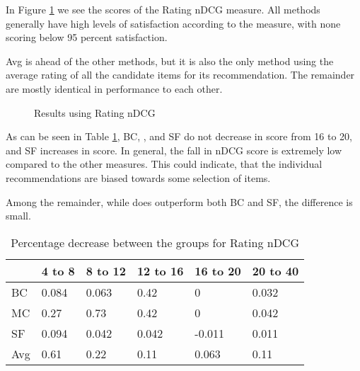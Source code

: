 In Figure \ref{fig:andcg} we see the scores of the Rating nDCG measure. All methods generally have high levels of satisfaction according to the measure, with none scoring below 95 percent satisfaction.

Avg is ahead of the other methods, but it is also the only method using the average rating of all the candidate items for its recommendation. The remainder are mostly identical in performance to each other.
\begin{figure}[H]
	\caption{Results using Rating nDCG}\label{fig:andcg}
\end{figure}

As can be seen in Table \ref{tbl:andcg}, BC, \MC, and SF do not decrease in score from 16 to 20, and SF increases in score. In general, the fall in nDCG score is extremely low compared to the other measures. This could indicate, that the individual recommendations are biased towards some selection of items.

Among the remainder, while \MC does outperform both BC and SF, the difference is small.

\begin{table}[H]
	\centering
	\begin{tabular}{|l|lllll|}\hline
		& 4 to 8 & 8 to 12 & 12 to 16 & 16 to 20 & 20 to 40 \\\hline
		BC 	& 0.084	& 0.063	& 0.42	& 0		& 0.032 \\
		MC  & 0.27	& 0.73	& 0.42	& 0		& 0.042 \\
		SF  & 0.094	& 0.042	& 0.042	&-0.011	& 0.011 \\
		Avg	& 0.61	& 0.22 	& 0.11	& 0.063	& 0.11  \\ \hline
	\end{tabular}
	\caption{Percentage decrease between the groups for Rating nDCG}
	\label{tbl:andcg}
\end{table}

